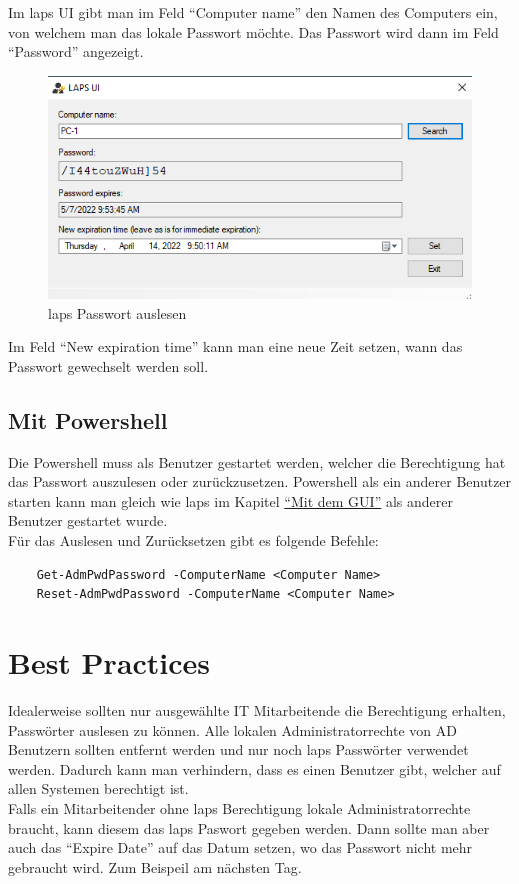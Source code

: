 Im \acrshort{laps} UI gibt man im Feld ``Computer name'' den Namen des Computers ein, von welchem man das lokale Passwort möchte.
Das Passwort wird dann im Feld ``Password'' angezeigt.
\begin{figure}[H]
    \centering
    \includegraphics[width=0.7\linewidth]{../img/LAPS/Laps-ui.png}
    \caption{\acrshort{laps} Passwort auslesen}
\end{figure}
Im Feld ``New expiration time'' kann man eine neue Zeit setzen, wann das Passwort gewechselt werden soll.

\subsection{Mit Powershell}
Die Powershell muss als Benutzer gestartet werden, welcher die Berechtigung hat das Passwort auszulesen oder zurückzusetzen.
Powershell als ein anderer Benutzer starten kann man gleich wie \acrshort{laps} im Kapitel \hyperref[subsec:laps-gui-usage]{``Mit dem GUI''} als anderer Benutzer gestartet wurde.\\

Für das Auslesen und Zurücksetzen gibt es folgende Befehle:
\begin{lstlisting}
    Get-AdmPwdPassword -ComputerName <Computer Name>
    Reset-AdmPwdPassword -ComputerName <Computer Name>
\end{lstlisting}


\section{Best Practices}
Idealerweise sollten nur ausgewählte IT Mitarbeitende die Berechtigung erhalten, Passwörter auslesen zu können.
Alle lokalen Administratorrechte von AD Benutzern sollten entfernt werden und nur noch \acrshort{laps} Passwörter verwendet werden.
Dadurch kann man verhindern, dass es einen Benutzer gibt, welcher auf allen Systemen berechtigt ist.\\

Falls ein Mitarbeitender ohne \acrshort{laps} Berechtigung lokale Administratorrechte braucht, kann diesem das \acrshort{laps} Paswort gegeben werden.
Dann sollte man aber auch das ``Expire Date'' auf das Datum setzen, wo das Passwort nicht mehr gebraucht wird.
Zum Beispeil am nächsten Tag.

